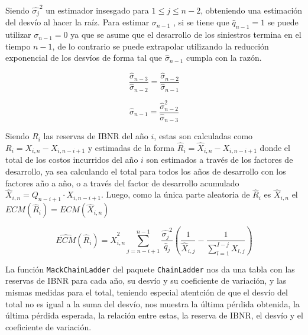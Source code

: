\documentclass[
  12pt,
]{article}
\begin{document}
Siendo \(\hat{\sigma_j}^2\) un estimador insesgado para
\(1 \leq j \leq n-2\), obteniendo una estimación del desvío al hacer la
raíz. Para estimar \(\sigma_{n-1}\) , si se tiene que
\(\hat{q}_{n-1}=1\) se puede utilizar \(\sigma_{n-1}=0\) ya que se asume
que el desarrollo de los siniestros termina en el tiempo \(n-1\), de lo
contrario se puede extrapolar utilizando la reducción exponencial de los
desvíos de forma tal que \(\hat{\sigma}_{n-1}\) cumpla con la razón.

\[
\frac{\hat{\sigma}_{n-3}}{\hat{\sigma}_{n-2}} = \frac{\hat{\sigma}_{n-2}}{\hat{\sigma}_{n-1}}
\]

\[
\hat{\sigma}_{n-1} = \frac{\hat{\sigma}_{n-2}^2}{\hat{\sigma}_{n-3}}
\]

Siendo \(R_i\) las reservas de IBNR del año \(i\), estas son calculadas
como \(R_i = X_{i,n} - X_{i,n-i+1}\) y estimadas de la forma
\(\hat{R}_i = \hat{X}_{i,n} - X_{i,n-i+1}\) donde el total de los costos
incurridos del año \(i\) son estimados a través de los factores de
desarrollo, ya sea calculando el total para todos los años de desarrollo
con los factores año a año, o a través del factor de desarrollo
acumulado \(\hat{X}_{i,n} = Q_{n-i+1}\cdot X_{i,n-i+1}\). Luego, como la
única parte aleatoria de \(\hat{R}_i\) es \(\hat{X}_{i,n}\) el
\(ECM(\hat{R}_i) = ECM(\hat{X}_{i,n})\)

\[
\widehat{ECM}(\hat{R}_i) = \hat{X}_{i,n}^2 \sum_{j=n-i+1}^{n-1} \frac{\hat{\sigma_j}^2}{\hat{q}_j}\left( \frac{1}{\hat{X}_{i,j}} - \frac{1}{\sum_{l=1}^{I-j}X_{l,j}} \right)
\]

La función \texttt{MackChainLadder} del paquete \texttt{ChainLadder} nos
da una tabla con las reservas de IBNR para cada año, su desvío y su
coeficiente de variación, y las mismas medidas para el total, teniendo
especial atentción de que el desvío del total no es igual a la suma del
desvío, nos muestra la última pérdida obtenida, la última pérdida
esperada, la relación entre estas, la reserva de IBNR, el desvío y el
coeficiente de variación.
\end{document}
